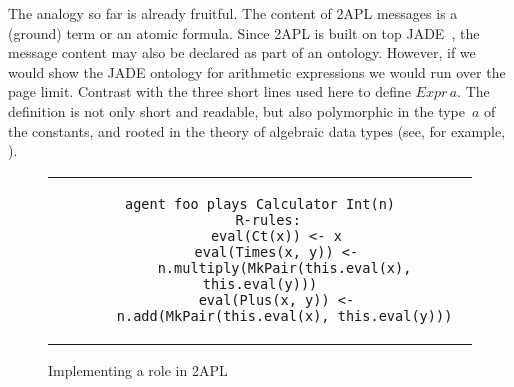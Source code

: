 \documentclass[conference,compsoc]{IEEEtran} %
\begin{document}
The analogy so far is already fruitful. The content of 2APL messages is a
(ground) term or an atomic formula. Since 2APL is built on top
JADE~\cite{DBLP:books/sp/map2005/BellifemineBCP05}, the message content may
also be declared as part of an ontology. However, if we would show the JADE
ontology for arithmetic expressions we would run over the page limit.
Contrast with the three short lines used here to define $\mathit{Expr}\,a$.
The definition is not only short and readable, but also polymorphic in the
type~$a$ of the constants, and rooted in the theory of algebraic data types
(see, for example, \cite{DBLP:conf/ctcs/Hagino87}).

\begin{figure}\footnotesize %
\begin{center}
\begin{tabular}{c}
\begin{lstlisting}[style=me]
agent foo plays Calculator Int(n)
  R-rules:
    eval(Ct(x)) <- x
    eval(Times(x, y)) <-
      n.multiply(MkPair(this.eval(x), this.eval(y)))
    eval(Plus(x, y)) <-
      n.add(MkPair(this.eval(x), this.eval(y)))
\end{lstlisting}
\end{tabular}
\end{center}
\caption{Implementing a role in 2APL}\label{fig:roleimpl2APL}
\end{figure} %
\end{document}
